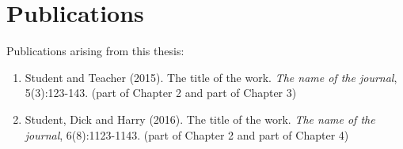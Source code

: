 

%
%

\chapter*{Publications}

Publications arising from this thesis:

\begin{enumerate}
\item Student and Teacher (2015). The title of the work. {\slshape The name of the journal}, 5(3):123-143. (part of Chapter 2 and part of Chapter 3)
\item Student, Dick and Harry (2016). The title of the work.   {\slshape The name of the journal}, 6(8):1123-1143. (part of Chapter 2 and part of Chapter 4)
\end{enumerate}
